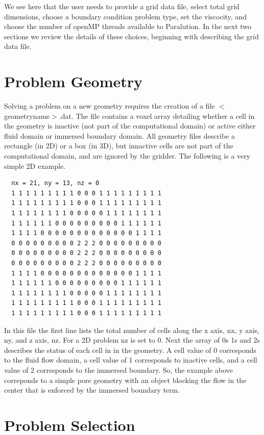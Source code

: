 \documentclass{report}
\begin{document}
\noindent We see here that the user needs to provide a grid data file,
select total grid dimensions, choose a boundary condition
problem type, set the viscocity, and choose the number of openMP
threads available to Paralution.
In the next two sections we review the details of these choices, beginning
with describing the grid data file.

\section{Problem Geometry}

Solving a problem on a new geometry requires the creation
of a file $<$geometryname$>$.dat. The file contains
a voxel array detailing whether a cell in the geometry
is inactive (not part of the computational domain) or active either
fluid domain or immersed boundary domain.
All geometry files describe a rectangle (in 2D) or a
box (in 3D), but innactive cells are not part of the computational domain,
and are ignored by the gridder.
The following is a very simple
2D example.
\lstset{style=custom}
\begin{lstlisting}
  nx = 21, ny = 13, nz = 0
  1 1 1 1 1 1 1 1 1 0 0 0 1 1 1 1 1 1 1 1 1
  1 1 1 1 1 1 1 1 1 0 0 0 1 1 1 1 1 1 1 1 1
  1 1 1 1 1 1 1 1 0 0 0 0 0 1 1 1 1 1 1 1 1
  1 1 1 1 1 1 0 0 0 0 0 0 0 0 0 1 1 1 1 1 1
  1 1 1 1 0 0 0 0 0 0 0 0 0 0 0 0 0 1 1 1 1
  0 0 0 0 0 0 0 0 0 2 2 2 0 0 0 0 0 0 0 0 0
  0 0 0 0 0 0 0 0 0 2 2 2 0 0 0 0 0 0 0 0 0
  0 0 0 0 0 0 0 0 0 2 2 2 0 0 0 0 0 0 0 0 0
  1 1 1 1 0 0 0 0 0 0 0 0 0 0 0 0 0 1 1 1 1
  1 1 1 1 1 1 0 0 0 0 0 0 0 0 0 1 1 1 1 1 1
  1 1 1 1 1 1 1 1 0 0 0 0 0 1 1 1 1 1 1 1 1
  1 1 1 1 1 1 1 1 1 0 0 0 1 1 1 1 1 1 1 1 1
  1 1 1 1 1 1 1 1 1 0 0 0 1 1 1 1 1 1 1 1 1

\end{lstlisting}

\noindent In this file the first line lists the total number of cells along the x axis, nx,
y axis, ny,
and z axis, nz. For a 2D problem nz is set to 0.
Next the array of 0s 1s and 2s describes the status of each cell in
in the geometry. A cell value of 0 corresponds to the fluid flow domain,
a cell value of 1 corresponds to inactive cells, and a cell value of 2
corresponds to the immersed boundary. So, the example
above correponds to a simple pore geometry with an object blocking
the flow in the center that is enforced by the immersed boundary term.

\section{Problem Selection}
\end{document}
